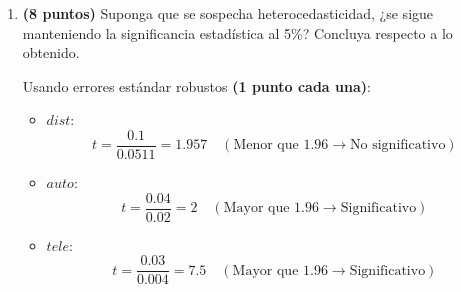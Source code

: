 \documentclass[10pt,a4paper]{article}
\begin{document}
\begin{enumerate}
\begin{enumerate}
{\color{blue}
\textbf{(1 punto cada una)}:
\begin{itemize}
    \item \(dist\): El coeficiente es \(0,1\), positivo, lo cual sugiere que un mejor promedio acumulado previo está asociado con un mayor \(GT\). Esto es coherente ya que una mayor distancia al trabajo debería asociarse con un mayor gasto en transporte.
    \item \(auto\): El coeficiente es \(0,04\), positivo pero de pequeña magnitud, indicando que el uso de automóvil incrementa el gasto promedio de transporte.
    \item \(tele\): El coeficiente es \(-0,03\), negativo pero de pequeña magnitud, indicando que un aumento en un día de teletrabajo disminuye el gasto en transporte (en 0,03 unidades monetarias).
\end{itemize}



Para evaluar la significancia estadística de estas variables, calculamos los valores \(t\) como:

\[
t = \frac{\text{Coeficiente}}{\text{Error estándar}}
\]

Usando errores estándar usuales \textbf{(1 punto cada una)}:
\begin{itemize}
    \item \(dist\): \[
    t = \frac{0.1}{0.05} = 2 \quad (\text{Mayor que } 1.96 \rightarrow \text{Significativo})
    \]
    \item \(auto\): \[
    t = \frac{0.04}{0.019} = 2.11 \quad (\text{Mayor que } 1.96 \rightarrow \text{Significativo})
    \]
    \item \(tele\): \[
    t = \frac{0.03}{0.006} = 5 \quad (\text{Mayor que } 1.96 \rightarrow \text{Significativo})
    \]
\end{itemize}
}

\item \textbf{(8 puntos)} Suponga que se sospecha heterocedasticidad, ¿se sigue manteniendo la significancia estadística al 5\%? Concluya respecto a lo obtenido.

{\color{blue}
Usando errores estándar robustos \textbf{(1 punto cada una)}:
\begin{itemize}
    \item \(dist\): \[
    t = \frac{0.1}{0.0511} = 1.957 \quad (\text{Menor que } 1.96 \rightarrow \text{No significativo})
    \]
    \item \(auto\): \[
    t = \frac{0.04}{0.02} = 2 \quad (\text{Mayor que } 1.96 \rightarrow \text{Significativo})
    \]
    \item \(tele\): \[
    t = \frac{0.03}{0.004} = 7.5 \quad (\text{Mayor que } 1.96 \rightarrow \text{Significativo})
    \]
\end{itemize}

}
\end{enumerate}
\end{enumerate}
\end{document}
